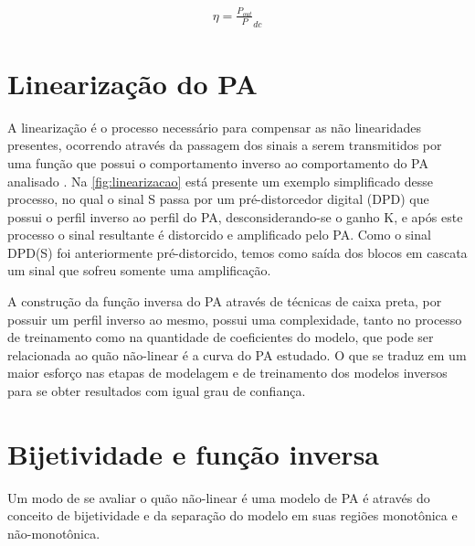 \begin{align}
\eta = \frac{P_{out}}P_{dc}
\label{eq:resultado}
\end{align}

\section{Linearização do PA} \label{sec:fundteo-line}
A linearização é o processo necessário para compensar as não linearidades presentes, ocorrendo através da passagem dos sinais a serem transmitidos por uma função que possui o comportamento inverso ao comportamento do PA analisado \cite{kenington_high-linearity_2000}. Na \autoref{fig:linearizacao} está presente um exemplo simplificado desse processo, no qual o sinal S passa por um pré-distorcedor digital (DPD) que possui o perfil inverso ao perfil do PA, desconsiderando-se o ganho K, e após este processo o sinal resultante é distorcido e amplificado pelo PA. Como o sinal DPD(S) foi anteriormente pré-distorcido, temos como saída dos blocos em cascata um sinal que sofreu somente uma amplificação.


A construção da função inversa do PA através de técnicas de caixa preta, por possuir um perfil inverso ao mesmo, possui uma complexidade, tanto no processo de treinamento como na quantidade de coeficientes do modelo, que pode ser relacionada ao quão não-linear é a curva do PA estudado. O que se traduz em um maior esforço nas etapas de modelagem e de treinamento dos modelos inversos para se obter resultados com igual grau de confiança.

\section{Bijetividade e função inversa} \label{sec:fundteo-bije}
Um modo de se avaliar o quão não-linear é uma modelo de PA é através do conceito de bijetividade e da separação do modelo em suas regiões monotônica e não-monotônica.

